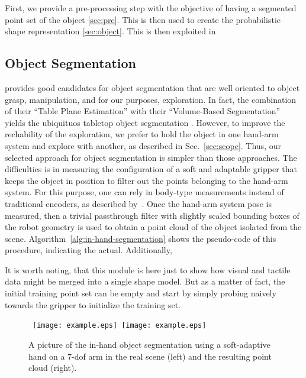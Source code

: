 First, we provide a pre-processing step with the objective of having a segmented
point  set  of  the object  \ref{sec:pre}.  This  is  then  used to  create  the
probabilistic shape representation \ref{sec:object}. This is then exploited in

\subsection{Object Segmentation}
\label{sec:segmentation}

\citep[Sec.~III.A]{Hudson2012Endtoend} provides good candidates for object segmentation that are well oriented to object grasp, manipulation, and for our purposes, exploration. In fact, the combination of their ``Table Plane Estimation'' with their ``Volume-Based Segmentation'' yields the ubiquituos tabletop object segmentation \citep{TabletopObjectDetector}. However, to improve the rechability of the exploration, we prefer to hold the object in one hand-arm system and explore with another, as described in Sec.~\ref{sec:scope}. Thus, our selected approach for object segmentation is simpler than those approaches. The difficulties is in measuring the configuration of a soft and adaptable gripper that keeps the object in position to filter out the points belonging to the hand-arm system. For this purpose, one can rely in body-type measurements instead of traditional encoders, as described by~\citet{Santaera2015Lowcost}. Once the hand-arm system pose is measured, then a trivial passthrough filter with slightly scaled bounding boxes of the robot geometry is used to obtain a point cloud of the object isolated from the scene. Algorithm~\ref{alg:in-hand-segmentation} shows the pseudo-code of this procedure, indicating the actual. Additionally, 

It is worth noting, that this module is here just to show how visual and tactile data might be merged into a single shape model. But as a matter of fact, the initial training point set can be empty and start by simply probing naively towards the gripper to initialize the training set.

\begin{figure}
\centering
  \mbox{
  \texttt{[image: example.eps]}
  \texttt{[image: example.eps]}
  }
  \caption{A picture of the in-hand object segmentation using a soft-adaptive hand on a 7-dof arm in the real scene (left) and the resulting point cloud (right).} \label{fig:in-hand-segmentation}
\end{figure}

